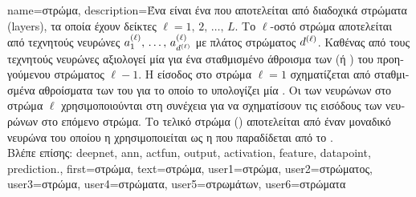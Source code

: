 {name={\foreignlanguage{greek}{στρώμα}},
	description={\foreignlanguage{greek}{Ένα}  
		\foreignlanguage{greek}{είναι ένα}  \foreignlanguage{greek}{που αποτελείται από διαδοχικά
		στρώματα} (layers), \foreignlanguage{greek}{τα οποία έχουν δείκτες $\ell=1,\,2,\,\ldots,\,L$. Το $\ell$-οστό 
		στρώμα αποτελείται από τεχνητούς νευρώνες $a^{(\ell)}_{1},\,\ldots,\,a^{(\ell)}_{d^{(\ell)}}$ με 
		πλάτος στρώματος $d^{(\ell)}$. Καθένας από τους τεχνητούς νευρώνες αξιολογεί μία} 
		 \foreignlanguage{greek}{για ένα σταθμισμένο άθροισμα των}  
		\foreignlanguage{greek}{(ή} ) \foreignlanguage{greek}{του προηγούμενου στρώματος 
		$\ell-1$. Η εί\-σοδος στο στρώμα $\ell=1$ σχηματίζεται από σταθμισμένα αθροίσματα των}  
		 \foreignlanguage{greek}{του}  \foreignlanguage{greek}{για το 
		οποίο το}  \foreignlanguage{greek}{υπολογίζει μία} . 
		\foreignlanguage{greek}{Οι}  \foreignlanguage{greek}{των νευρώνων στο στρώμα $\ell$ 
		χρησιμοποιούνται στη συνέχεια για να σχηματίσουν τις εισόδους των νευρώνων στο επόμενο στρώμα. 
		Το τελικό στρώμα} () \foreignlanguage{greek}{αποτελείται από  
		έναν μοναδικό νευρώνα του οποίου η}  \foreignlanguage{greek}{χρησιμοποιείται ως 
		η}  \foreignlanguage{greek}{που παραδίδεται από το} . 
		\\
		\foreignlanguage{greek}{Βλέπε επίσης:} \gls{deepnet}, \gls{ann}, \gls{actfun}, \gls{output}, \gls{activation}, 
		\gls{feature}, \gls{datapoint}, \gls{prediction}.}, 
	first={\foreignlanguage{greek}{στρώμα}},
	text={\foreignlanguage{greek}{στρώμα}},
	user1={\foreignlanguage{greek}{στρώμα}}, %
	user2={\foreignlanguage{greek}{στρώματος}}, %
	user3={\foreignlanguage{greek}{στρώμα}}, %
	user4={\foreignlanguage{greek}{στρώματα}}, %
	user5={\foreignlanguage{greek}{στρωμάτων}}, %
	user6={\foreignlanguage{greek}{στρώματα}} %
}

